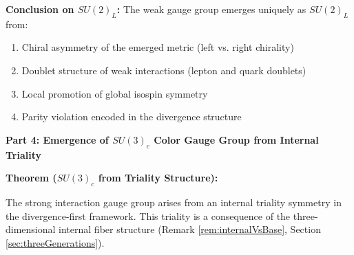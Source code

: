 \textbf{Conclusion on $SU(2)_L$:} The weak gauge group emerges uniquely as $SU(2)_L$ from:
\begin{enumerate}
\item Chiral asymmetry of the emerged metric (left vs. right chirality)
\item Doublet structure of weak interactions (lepton and quark doublets)
\item Local promotion of global isospin symmetry
\item Parity violation encoded in the divergence structure
\end{enumerate}

\textbf{Part 4: Emergence of $SU(3)_c$ Color Gauge Group from Internal Triality}

\textbf{Theorem ($SU(3)_c$ from Triality Structure):}

The strong interaction gauge group arises from an internal triality symmetry in the divergence-first framework. This triality is a consequence of the three-dimensional internal fiber structure (Remark \ref{rem:internalVsBase}, Section \ref{sec:threeGenerations}).

